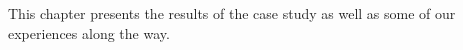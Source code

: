 This chapter presents the results of the case study as well as some of
our experiences along the way.
